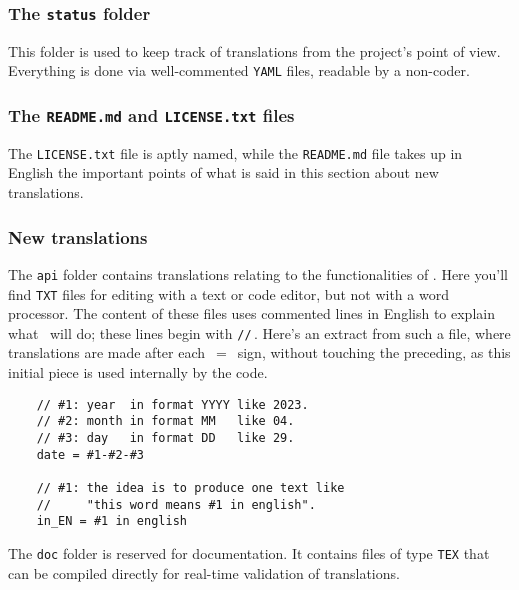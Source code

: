 \subsubsection{The \texttt{status} folder}

This folder is used to keep track of translations from the project's point of view. Everything is done via well-commented \verb#YAML# files, readable by a non-coder.


\subsubsection{The \texttt{README.md} and \texttt{LICENSE.txt} files}

The \texttt{LICENSE.txt} file is aptly named, while the \texttt{README.md} file takes up in English the important points of what is said in this section about new translations.


\subsubsection{New translations}
\label{tutodoc-contrib-translate}

\begin{tdocimp}
    The \verb#api# folder contains translations relating to the functionalities of \thisproj.
    Here you'll find \verb#TXT# files for editing with a text or code editor, but not with a word processor.
    The content of these files uses commented lines in English to explain what \thisproj\ will do; these lines begin with \verb#//#\,. Here's an extract from such a file, where translations are made after each \,$=$\ sign, without touching the preceding, as this initial piece is used internally by the \thisproj code.

    \tdocsep
    \vspace{-10pt}
    \begin{verbatim}
    // #1: year  in format YYYY like 2023.
    // #2: month in format MM   like 04.
    // #3: day   in format DD   like 29.
    date = #1-#2-#3

    // #1: the idea is to produce one text like
    //     "this word means #1 in english".
    in_EN = #1 in english\end{verbatim}
\end{tdocimp}


\begin{tdocnote}
    The \verb#doc# folder is reserved for documentation. It contains files of type \verb#TEX# that can be compiled directly for real-time validation of translations.
\end{tdocnote}


